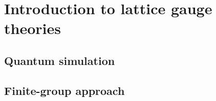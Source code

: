 \chapter{Introduction to lattice gauge theories}
\label{chap:introduction_to_lattice_gauge_theories}








\section{Quantum simulation}
\label{sec:quantum_simulation}

\section{Finite-group approach}
\label{sec:finite_group_approach}
